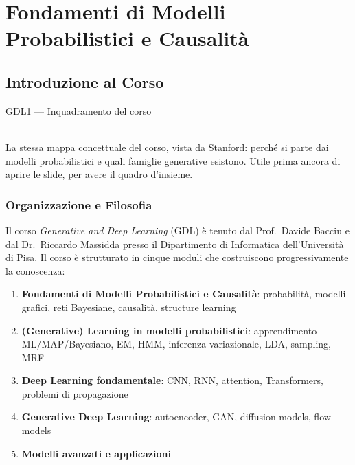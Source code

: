 
\part{Fondamenti di Modelli Probabilistici e Causalità}

\chapter{Introduzione al Corso}

\begin{risorsevideo}{GDL1 — Inquadramento del corso}

\medskip
{}\\
La stessa mappa concettuale del corso, vista da Stanford: perché si parte dai modelli probabilistici e quali famiglie generative esistono. Utile prima ancora di aprire le slide, per avere il quadro d'insieme.
\end{risorsevideo}

\section{Organizzazione e Filosofia}

Il corso \textit{Generative and Deep Learning} (GDL) è tenuto dal Prof.\ Davide Bacciu e dal Dr.\ Riccardo Massidda presso il Dipartimento di Informatica dell'Università di Pisa. Il corso è strutturato in cinque moduli che costruiscono progressivamente la conoscenza:

\begin{enumerate}
    \item \textbf{Fondamenti di Modelli Probabilistici e Causalità}: probabilità, modelli grafici, reti Bayesiane, causalità, structure learning
    \item \textbf{(Generative) Learning in modelli probabilistici}: apprendimento ML/MAP/Bayesiano, EM, HMM, inferenza variazionale, LDA, sampling, MRF
    \item \textbf{Deep Learning fondamentale}: CNN, RNN, attention, Transformers, problemi di propagazione
    \item \textbf{Generative Deep Learning}: autoencoder, GAN, diffusion models, flow models
    \item \textbf{Modelli avanzati e applicazioni}
\end{enumerate}


